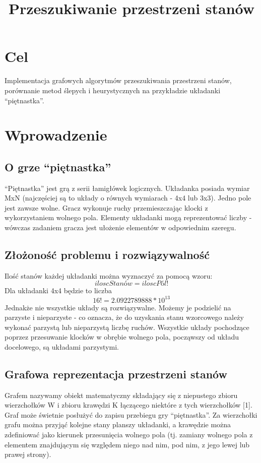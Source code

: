 \documentclass{classrep}
\author{
  \studentinfo{Marcin Pajkowski}{211968} \and
  \studentinfo{Rafał Warda}{214067}
}
\title{Przeszukiwanie przestrzeni stanów}
\begin{document}
\maketitle
\newpage

\section{Cel}

Implementacja grafowych algorytmów przeszukiwania przestrzeni stanów,
porównanie metod ślepych i heurystycznych na przykładzie układanki
``piętnastka''.

\section{Wprowadzenie}

\subsection{O grze ``piętnastka''}

``Piętnastka'' jest grą z serii łamigłówek logicznych. Układanka posiada
wymiar MxN (najczęściej są to układy o równych wymiarach - 4x4 lub 3x3).
Jedno pole jest zawsze wolne. Gracz wykonuje ruchy przemieszczając
klocki z wykorzystaniem wolnego pola. Elementy układanki mogą
reprezentować liczby - wówczas zadaniem gracza jest ułożenie elementów w
odpowiednim szeregu.

\subsection{Złożoność problemu i rozwiązywalność}

Ilość stanów każdej układanki można wyznaczyć za pomocą wzoru:
\[ iloscStanów = iloscPól! \] Dla układanki 4x4 będzie to liczba
\[ 16! = 2.0922789888 * 10^{13} \] Jednakże nie wszystkie układy są
rozwiązywalne. Możemy je podzielić na parzyste i nieparzyste - co
oznacza, że do uzyskania stanu wzorcowego należy wykonać parzystą lub
nieparzystą liczbę ruchów. Wszystkie układy pochodzące poprzez
przesuwanie klocków w obrębie wolnego pola, począwszy od układu
docelowego, są układami parzystymi.

\subsection{Grafowa reprezentacja przestrzeni
stanów}

Grafem nazywamy obiekt matematyczny składający się z niepustego zbioru
wierzchołków W i zbioru krawędzi K łączącego niektóre z tych
wierzchołków {[}1{]}. Graf może świetnie posłużyć do zapisu przebiegu
gry ``piętnastka''. Za wierzchołki grafu można przyjąć kolejne stany
planszy układanki, a krawędzie można zdefiniować jako kierunek
przesunięcia wolnego pola (tj. zamiany wolnego pola z elementem
znajdującym się względem niego nad nim, pod nim, z jego lewej lub prawej
strony).
\end{document}
